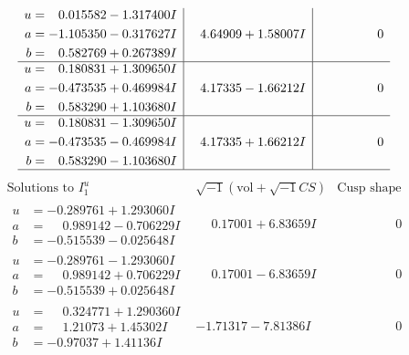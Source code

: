 \documentclass[1p]{elsarticle_modified}
\theoremstyle{definition}
\newcommand{\I}{\sqrt{-1}}
\begin{document}
$$\begin{array}{c|c|c}
\begin{aligned}
u &= \phantom{-}0.015582 - 1.317400 I \\
a &= -1.105350 - 0.317627 I \\
b &= \phantom{-}0.582769 + 0.267389 I\end{aligned}
 & \phantom{-}4.64909 + 1.58007 I & \phantom{-0.000000 } 0 \\ \hline\begin{aligned}
u &= \phantom{-}0.180831 + 1.309650 I \\
a &= -0.473535 + 0.469984 I \\
b &= \phantom{-}0.583290 + 1.103680 I\end{aligned}
 & \phantom{-}4.17335 - 1.66212 I & \phantom{-0.000000 } 0 \\ \hline\begin{aligned}
u &= \phantom{-}0.180831 - 1.309650 I \\
a &= -0.473535 - 0.469984 I \\
b &= \phantom{-}0.583290 - 1.103680 I\end{aligned}
 & \phantom{-}4.17335 + 1.66212 I & \phantom{-0.000000 } 0\\
 \hline 
 \end{array}$$\newpage$$\begin{array}{c|c|c}  
\text{Solutions to }I^u_{1}& \I (\text{vol} + \sqrt{-1}CS) & \text{Cusp shape}\\
 \hline 
\begin{aligned}
u &= -0.289761 + 1.293060 I \\
a &= \phantom{-}0.989142 - 0.706229 I \\
b &= -0.515539 - 0.025648 I\end{aligned}
 & \phantom{-}0.17001 + 6.83659 I & \phantom{-0.000000 } 0 \\ \hline\begin{aligned}
u &= -0.289761 - 1.293060 I \\
a &= \phantom{-}0.989142 + 0.706229 I \\
b &= -0.515539 + 0.025648 I\end{aligned}
 & \phantom{-}0.17001 - 6.83659 I & \phantom{-0.000000 } 0 \\ \hline\begin{aligned}
u &= \phantom{-}0.324771 + 1.290360 I \\
a &= \phantom{-}1.21073 + 1.45302 I \\
b &= -0.97037 + 1.41136 I\end{aligned}
 & -1.71317 - 7.81386 I & \phantom{-0.000000 } 0 \\ \hline\begin{aligned}

\end{aligned}
\end{array}$$
\end{document}
